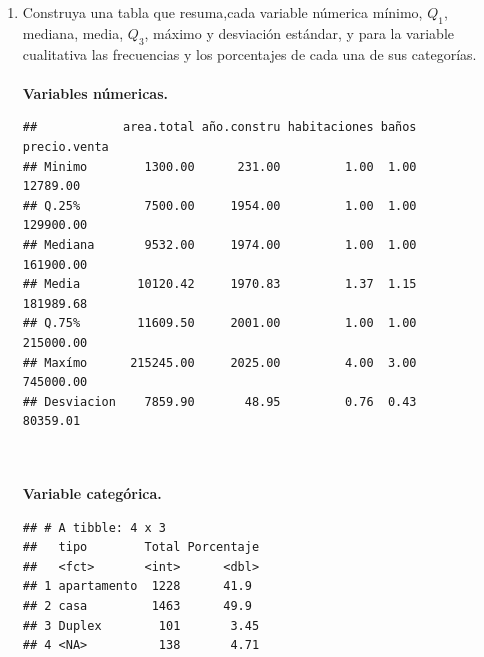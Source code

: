 \documentclass[9pt,letterpaper]{article}\usepackage[]{graphicx}\usepackage[]{color}
\makeatletter
\newenvironment{kframe}{%
 \def\at@end@of@kframe{}%
 \ifinner\ifhmode%
  \def\at@end@of@kframe{\end{minipage}}%
  \begin{minipage}{\columnwidth}%
 \fi\fi%
 \def\FrameCommand##1{\hskip\@totalleftmargin \hskip-\fboxsep
 \colorbox{shadecolor}{##1}\hskip-\fboxsep
     \hskip-\linewidth \hskip-\@totalleftmargin \hskip\columnwidth}%
 \MakeFramed {\advance\hsize-\width
   \@totalleftmargin\z@ \linewidth\hsize
   \@setminipage}}%
 {\par\unskip\endMakeFramed%
 \at@end@of@kframe}
\newenvironment{knitrout}{}{} %
\makeatother
\begin{document}
\begin{enumerate}
    \item  Construya una tabla que resuma,cada variable númerica mínimo, $Q_1$, mediana, media, $Q_3$, máximo y desviación estándar, y para la variable cualitativa las frecuencias y los porcentajes de cada una de sus categorías.
\\ \\
\textbf{Variables númericas.}
\begin{knitrout}
\color{fgcolor}\begin{kframe}
\begin{verbatim}
##            area.total año.constru habitaciones baños precio.venta
## Minimo        1300.00      231.00         1.00  1.00     12789.00
## Q.25%         7500.00     1954.00         1.00  1.00    129900.00
## Mediana       9532.00     1974.00         1.00  1.00    161900.00
## Media        10120.42     1970.83         1.37  1.15    181989.68
## Q.75%        11609.50     2001.00         1.00  1.00    215000.00
## Maxímo      215245.00     2025.00         4.00  3.00    745000.00
## Desviacion    7859.90       48.95         0.76  0.43     80359.01
\end{verbatim}
\end{kframe}
\end{knitrout}
 \\ \\
 \textbf{Variable categórica.}
\begin{knitrout}
\color{fgcolor}\begin{kframe}
\begin{verbatim}
## # A tibble: 4 x 3
##   tipo        Total Porcentaje
##   <fct>       <int>      <dbl>
## 1 apartamento  1228      41.9 
## 2 casa         1463      49.9 
## 3 Duplex        101       3.45
## 4 <NA>          138       4.71
\end{verbatim}
\end{kframe}
\end{knitrout}
 

\end{enumerate}
\end{document}
